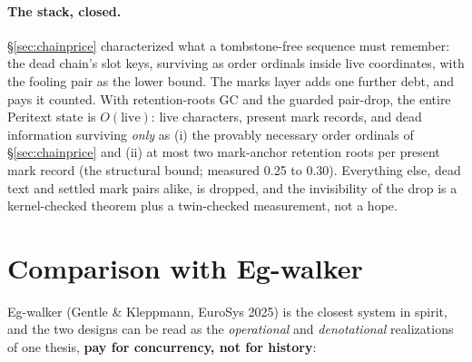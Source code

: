 \documentclass[11pt]{article}
\begin{document}
\paragraph{The stack, closed.} \S\ref{sec:chainprice} characterized
what a tombstone-free sequence must remember: the dead chain's slot
keys, surviving as order ordinals inside live coordinates, with the
fooling pair as the lower bound. The marks layer adds one further
debt, and pays it counted. With retention-roots GC and the guarded
pair-drop, the entire Peritext state is $O(\mathrm{live})$: live
characters, present mark records, and dead information surviving
\emph{only} as (i) the provably necessary order ordinals of
\S\ref{sec:chainprice} and (ii) at most two mark-anchor retention
roots per present mark record (the structural bound; measured 0.25 to
0.30). Everything else, dead text and settled mark pairs alike, is
dropped, and the invisibility of the drop is a kernel-checked theorem
plus a twin-checked measurement, not a hope.

\section{Comparison with Eg-walker}
\label{sec:egwalker}

Eg-walker (Gentle \& Kleppmann, EuroSys 2025) is the closest system in
spirit, and the two designs can be read as the \emph{operational} and
\emph{denotational} realizations of one thesis, \textbf{pay for
concurrency, not for history}:
\end{document}
